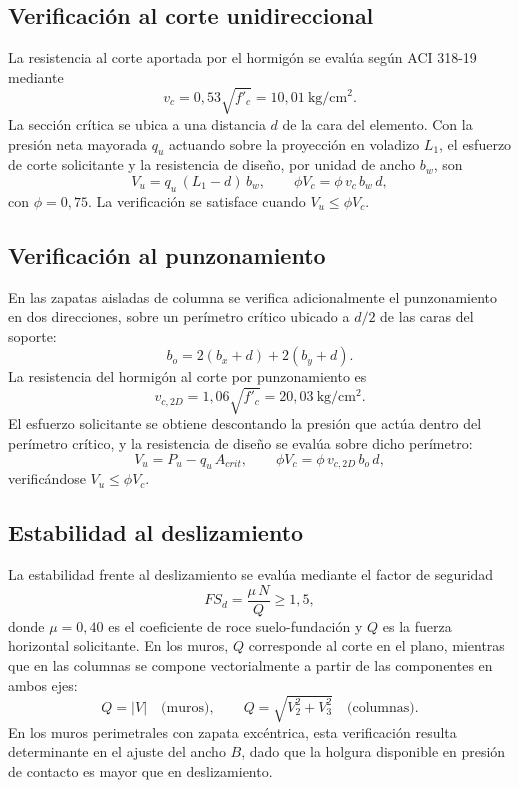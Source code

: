 \subsection{Verificación al corte unidireccional}
La resistencia al corte aportada por el hormigón se evalúa según ACI 318-19 mediante
\begin{equation}
v_c = 0,53\sqrt{f'_c} = 10,01~\mathrm{kg/cm^2}.
\end{equation}
La sección crítica se ubica a una distancia $d$ de la cara del elemento. Con la presión neta mayorada $q_u$ actuando sobre la proyección en voladizo $L_1$, el esfuerzo de corte solicitante y la resistencia de diseño, por unidad de ancho $b_w$, son
\begin{equation}
V_u = q_u\,(L_1 - d)\,b_w, \qquad \phi V_c = \phi \, v_c \, b_w \, d,
\end{equation}
con $\phi = 0,75$. La verificación se satisface cuando $V_u \le \phi V_c$.

\subsection{Verificación al punzonamiento}
En las zapatas aisladas de columna se verifica adicionalmente el punzonamiento en dos direcciones, sobre un perímetro crítico ubicado a $d/2$ de las caras del soporte:
\begin{equation}
b_o = 2\left( b_x + d \right) + 2\left( b_y + d \right).
\end{equation}
La resistencia del hormigón al corte por punzonamiento es
\begin{equation}
v_{c,2D} = 1,06\sqrt{f'_c} = 20,03~\mathrm{kg/cm^2}.
\end{equation}
El esfuerzo solicitante se obtiene descontando la presión que actúa dentro del perímetro crítico, y la resistencia de diseño se evalúa sobre dicho perímetro:
\begin{equation}
V_u = P_u - q_u\,A_{crit}, \qquad \phi V_c = \phi \, v_{c,2D} \, b_o \, d,
\end{equation}
verificándose $V_u \le \phi V_c$.

\subsection{Estabilidad al deslizamiento}
La estabilidad frente al deslizamiento se evalúa mediante el factor de seguridad
\begin{equation}
FS_d = \frac{\mu \, N}{Q} \ge 1,5,
\end{equation}
donde $\mu = 0,40$ es el coeficiente de roce suelo-fundación y $Q$ es la fuerza horizontal solicitante. En los muros, $Q$ corresponde al corte en el plano, mientras que en las columnas se compone vectorialmente a partir de las componentes en ambos ejes:
\begin{equation}
Q = |V| \quad \text{(muros)}, \qquad Q = \sqrt{V_2^2 + V_3^2} \quad \text{(columnas)}.
\end{equation}
En los muros perimetrales con zapata excéntrica, esta verificación resulta determinante en el ajuste del ancho $B$, dado que la holgura disponible en presión de contacto es mayor que en deslizamiento.

